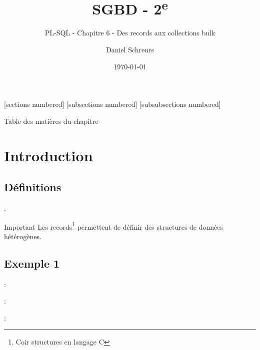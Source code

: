 \documentclass[10pt]{beamer}
\title{SGBD - 2\textsuperscript{e}}
\subtitle{PL-SQL - Chapitre 6 - Des records aux collections bulk}
\date{\today}
\author{Daniel Schreurs}
\institute{Haute École de Province de Liège}
\begin{document}
\maketitle

[sections numbered]
[subsections numbered]
[subsubsections numbered]
\begin{frame}[allowframebreaks]{Table des matières du chapitre}
    \tableofcontents[subsectionstyle=show/show/hide,subsubsectionstyle=show/show/hide,]
\end{frame}

\section{Introduction}
\tocss
\subsection{Définitions}
\begin{frame}{\secname : \subsecname}
    \begin{alertblock}{Important}
        Les records\footnote{Coir structures en langage C} permettent de définir des structures de données hétérogènes.
    \end{alertblock}
\end{frame}
\subsection{Exemple 1}

\begin{frame}{\secname : \subsecname}
    
\end{frame}

\begin{frame}{\secname : \subsecname}
    
\end{frame}



\begin{frame}{\secname : \subsecname}
    
\end{frame}
\end{document}
